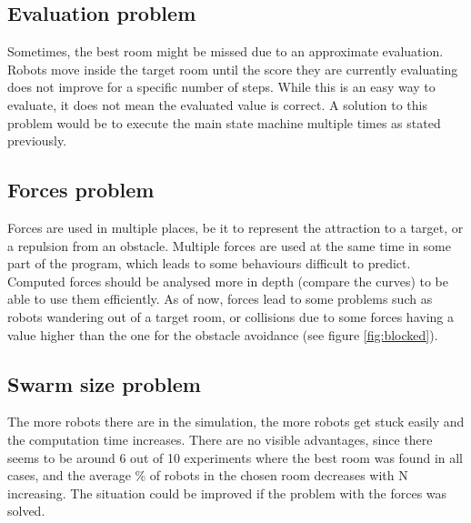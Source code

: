 \subsection{Evaluation problem}

Sometimes, the best room might be missed due to an approximate evaluation.
Robots move inside the target room until the score they are currently evaluating
does not improve for a specific number of steps. While this is an easy way to
evaluate, it does not mean the evaluated value is correct. A solution to this
problem would be to execute the main state machine multiple times as stated
previously.

\subsection{Forces problem}

Forces are used in multiple places, be it to represent the attraction to a
target, or a repulsion from an obstacle. Multiple forces are used at the same
time in some part of the program, which leads to some behaviours difficult to
predict. Computed forces should be analysed more in depth (compare the curves)
to be able to use them efficiently. As of now, forces lead to some problems such
as robots wandering out of a target room, or collisions due to some forces
having a value higher than the one for the obstacle avoidance (see figure
\ref{fig:blocked}).

\subsection{Swarm size problem}

The more robots there are in the simulation, the more robots get stuck easily
and the computation time increases. There are no visible advantages, since
there seems to be around 6 out of 10 experiments where the best room was found
in all cases, and the average \% of robots in the chosen room decreases with N
increasing. The situation could be improved if the problem with the forces was
solved.\\

